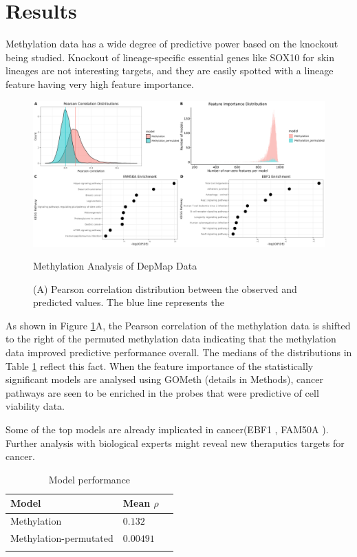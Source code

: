 \documentclass[10pt, a4paper, twocolumn]{article} %
\begin{document}

\section{Results}

Methylation data has a wide degree of predictive power based on the knockout being studied. Knockout of lineage-specific essential genes like SOX10 for skin lineages are not interesting targets, and they are easily spotted with a lineage feature having very high feature importance. 

\begin{figure}
	\includegraphics[width=\textwidth]{summary.png} %
	\caption{Methylation Analysis of DepMap Data} %
    \caption*{(A) Pearson correlation distribution between the observed and predicted values. The blue line represents the }
	\label{pearson} %
\end{figure}

As shown in Figure \ref{pearson}A, the Pearson correlation of the methylation data is shifted to the right of the permuted methylation data indicating that the methylation data improved predictive performance overall. The medians of the distributions in Table \ref{model_performance} reflect this fact. When the feature importance of the statistically significant models are analysed using GOMeth (details in Methods), cancer pathways are seen to be enriched in the probes that were predictive of cell viability data.

Some of the top models are already implicated in cancer(EBF1 \citep{Shen2020-gq}, FAM50A \citep{KOFERLE2022110636}). Further analysis with biological experts might reveal new theraputics targets for cancer.


\begin{table}
	\caption{Model performance}
	\centering
	\begin{tabular}{llr}
		\toprule
		\cmidrule(r){1-2}
		Model & Mean $\rho$ \\
		\midrule
		Methylation & $0.132$  \\ 
		Methylation-permutated & $0.00491$ \\
		\bottomrule
            \label{model_performance}
	\end{tabular}
\end{table}
\end{document}
